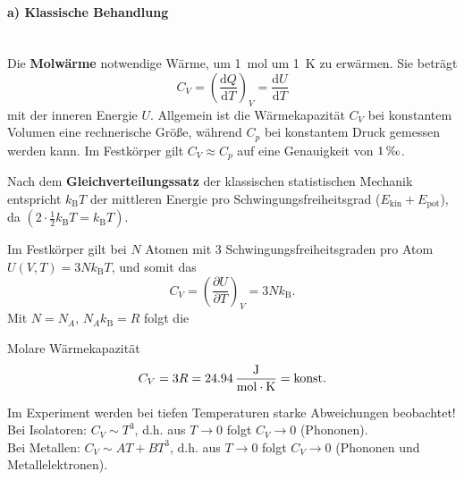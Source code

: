 \paragraph{a) Klassische Behandlung}\,\\
	Die \textbf{Molwärme} notwendige Wärme, um \SI{1}{\mol} um \SI{1}{\kelvin} zu erwärmen. Sie beträgt
	\begin{equation}
		\label{eq:II.6.9}
		C_{V} = \left( \frac{\mathrm{d}Q}{\mathrm{d}T} \right) _{V} = \frac{\mathrm{d}U}{\mathrm{d}T}
	\end{equation}
	mit der inneren Energie $U$. Allgemein ist die Wärmekapazität $C_{V}$ bei konstantem Volumen eine rechnerische Größe, während $C_{p}$ bei konstantem Druck gemessen werden kann. 
	Im Festkörper gilt $C_{V} \approx C_{p}$ auf eine Genauigkeit von $1\,\text{\textperthousand}$.

	Nach dem \textbf{Gleichverteilungssatz} der klassischen statistischen Mechanik entspricht $k_{\mathrm{B}}T$ der mittleren Energie pro Schwingungsfreiheitsgrad ($E_{\text{kin}} + E_{\text{pot}}$), da ${\left( 2 \cdot \frac{1}{2} k_{\mathrm{B}}T =  k_\mathrm{B}T\right)}.$

	Im Festkörper gilt bei $N$ Atomen mit 3 Schwingungsfreiheitsgraden pro Atom \\${U\left( V,T \right) = 3N k_{\mathrm{B}}T}$, und somit das 
	\begin{equation}
		\label{eq:II.6.10}
		C_{V} = \left( \frac{\partial U}{\partial T} \right) _{V} = 3Nk_{\mathrm{B}}.
	\end{equation}
	Mit $N = N_{A}$, $N_{A}k_{\mathrm{B}} = R$ folgt die 
	\begin{important}
		Molare Wärmekapazität
		$$
		C_{V} = 3R = \SI{24,94}{\frac{\joule}{\mol \cdot \kelvin}} = \text{konst.}
		$$
	\end{important} 
	Im Experiment werden bei tiefen Temperaturen starke Abweichungen beobachtet!\\
	Bei Isolatoren: $C_{V}\sim T^3$, d.h. aus $T \to 0$ folgt $C_{V} \to 0$ (Phononen).\\
	Bei Metallen: $C_{V} \sim AT + BT^3$, d.h. aus $T\to 0$ folgt $C_{V} \to 0$ (Phononen und Metallelektronen).

